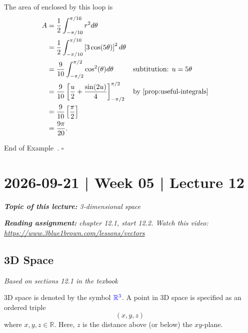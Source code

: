 \documentclass[10pt]{article}
\DeclareRobustCommand{\demph}[1]{%
  \ifmmode
  {\color{Blue}#1}%
  \else
  {\color{Blue}\bfseries\slshape #1}%
  \fi
}
\theoremstyle{definition}
\newtheorem{example}[theorem]{Example}
\renewenvironment{example}
{\begin{oldexample}}
  {\par\smallskip\hfill   End of Example~\theexample. $\square$    \par\end{oldexample}}
\newcommand{\1}[1]{\textbf{1}_{\left[#1\right]}} %
\def\R{\mathbb{R}} %
\begin{document}
\begin{example}
\begin{center}
  \end{center}
  The area of enclosed by this loop is
  \begin{align*}
    A 
    &= \frac{1}{2}\int_{-\pi/10}^{\pi/10} r^{2}d\theta\\
    &= \frac{1}{2}\int_{-\pi/10}^{\pi/10} \left[ 3\cos(5\theta) \right]^{2}  d\theta\\
    &= \frac{9}{10}\int_{-\pi/2}^{\pi/2} \cos^{2}(\theta)d\theta &&\text{subtitution: $u=5\theta$ }\\
    &= \frac{9}{10} \left[ \frac{u}{2}+\frac{\sin(2u)}{4} \right]^{\pi/2}_{-\pi/2} &&\text{by \cref{prop:useful-integrals} } \\
    &= \frac{9}{10} \left[ \frac{\pi}{2}    \right]\\
    &= \frac{9\pi}{20}.
  \end{align*}
\end{example}

\newpage
\section{2026-09-21 | Week 05 | Lecture 12}


\begin{center}
  \begin{tcolorbox}[width=0.9\textwidth, colback=white, colframe=black]
    \textit{\textbf{Topic of this lecture:} 3-dimensional space}

    \textit{\textbf{Reading assignment:} chapter 12.1, start 12.2. Watch this
      video: \url{https://www.3blue1brown.com/lessons/vectors}}
  \end{tcolorbox}
\end{center}

\subsection{3D Space}
\textit{Based on sections 12.1 in the texbook}

3D space is denoted by the symbol $\demph{\R^{3}}$. A point in 3D space is specified as an ordered triple
\begin{equation*}
  \left( x,y,z \right) 
\end{equation*}
where $x,y,z\in \R$. Here, $z$ is the distance above (or below) the $xy$-plane.
\end{document}
